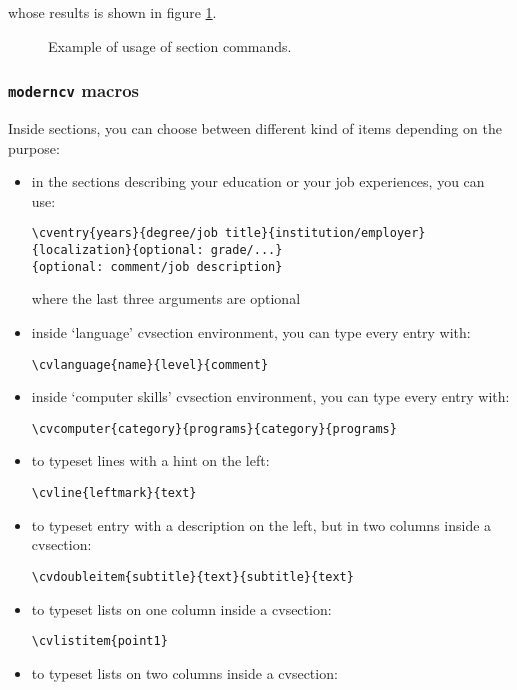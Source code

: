 \documentclass[a4paper,11pt]{article}
\begin{document}
whose results is shown in figure \ref{fig:ex_sec}.

\begin{figure}[!ht]
 \centering
 \caption{Example of usage of section commands.}
 \label{fig:ex_sec}
\end{figure}

\subsubsection{\texttt{moderncv} macros}

Inside sections, you can choose between different kind of items depending on the purpose:

\begin{itemize}
 \item in the sections describing your education or your job experiences, you can use:
 \begin{verbatim}
\cventry{years}{degree/job title}{institution/employer}
{localization}{optional: grade/...}
{optional: comment/job description}
  \end{verbatim} 
\vspace{-20pt}  
where the last three arguments are optional
 \item inside `language' cvsection environment, you can type every entry with:
 \begin{verbatim}
\cvlanguage{name}{level}{comment}
 \end{verbatim}
 \item inside `computer skills' cvsection environment, you can type every entry with:
 \begin{verbatim}
\cvcomputer{category}{programs}{category}{programs}
 \end{verbatim}
 \item to typeset lines with a hint on the left:
 \begin{verbatim}
\cvline{leftmark}{text}
 \end{verbatim}
 \item to typeset entry with a description on the left, but in two columns inside a cvsection:
 \begin{verbatim}
\cvdoubleitem{subtitle}{text}{subtitle}{text}
 \end{verbatim}
 \item to typeset lists on one column inside a cvsection:
 \begin{verbatim}
\cvlistitem{point1}
 \end{verbatim}
 \item to typeset lists on two columns inside a cvsection:

\end{itemize}
\end{document}
